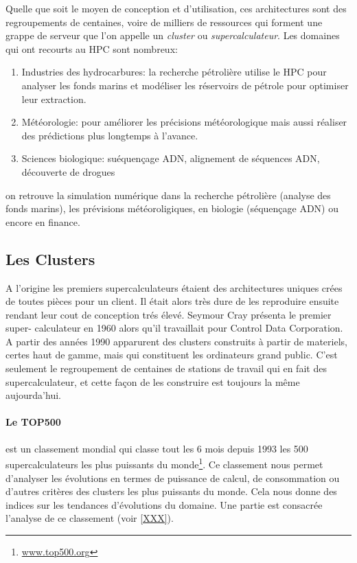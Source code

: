 Quelle que soit le moyen de conception et d'utilisation, ces architectures sont des regroupements de centaines, voire de milliers de ressources qui forment une grappe de serveur que l'on appelle un \textit{cluster} ou \textit{supercalculateur}. Les domaines qui ont recourts au HPC sont nombreux:

\begin{enumerate}
\item Industries des hydrocarbures: la recherche pétrolière utilise le HPC pour analyser les fonds marins et modéliser les réservoirs de pétrole pour optimiser leur extraction.
\item Météorologie: pour améliorer les précisions météorologique mais aussi réaliser des prédictions plus longtemps à l'avance. 
\item Sciences biologique: suéquençage ADN, alignement de séquences ADN, découverte de drogues 
\end{enumerate}
 on retrouve la simulation numérique dans la recherche pétrolière (analyse des fonds marins), les prévisions météoroligiques, en biologie (séquençage ADN) ou encore en finance.

\subsection{Les Clusters}
A l'origine les premiers supercalculateurs étaient des architectures uniques crées de toutes pièces pour un client. Il était alors très dure de les reproduire ensuite rendant leur cout de conception trés élevé. Seymour Cray présenta le premier super- calculateur en 1960 alors qu'il travaillait pour Control Data Corporation. A partir des années 1990 apparurent des clusters construits à partir de materiels, certes haut de gamme, mais qui constituent les ordinateurs grand public. C'est seulement le regroupement de centaines de stations de travail qui en fait des supercalculateur, et cette façon de les construire est toujours la même aujourda'hui.

\paragraph{Le TOP500} est un classement mondial qui classe tout les 6 mois depuis 1993 les 500 supercalculateurs les plus puissants du monde\footnote{\url{www.top500.org}}. Ce classement nous permet d'analyser les évolutions en termes de puissance de calcul, de consommation ou d'autres critères des clusters les plus puissants du monde. Cela nous donne des indices sur les tendances d'évolutions du domaine. Une partie est consacrée l'analyse de ce classement (voir \autoref{XXX}).





